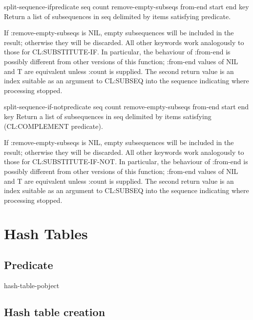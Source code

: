 \documentclass[10pt,english]{book}
\begin{document}
\begin{function}{split-sequence-if}{predicate seq \key count
    remove-empty-subseqs from-end start end key}
  Return a list of subsequences in seq delimited by items satisfying
  predicate.

  If :remove-empty-subseqs is NIL, empty subsequences will be included
  in the result; otherwise they will be discarded.  All other keywords
  work analogously to those for CL:SUBSTITUTE-IF.  In particular, the
  behaviour of :from-end is possibly different from other versions of
  this function; :from-end values of NIL and T are equivalent unless
  :count is supplied. The second return value is an index suitable as an
  argument to CL:SUBSEQ into the sequence indicating where processing
  stopped.  
\end{function}

\begin{function}{split-sequence-if-not}{predicate seq \key count
    remove-empty-subseqs from-end start end key}
  Return a list of subsequences in seq delimited by items satisfying
  (CL:COMPLEMENT predicate).

  If :remove-empty-subseqs is NIL, empty subsequences will be included
  in the result; otherwise they will be discarded. All other keywords
  work analogously to those for CL:SUBSTITUTE-IF-NOT. In particular,
  the behaviour of :from-end is possibly different from other versions
  of this function; :from-end values of NIL and T are equivalent
  unless :count is supplied. The second return value is an index
  suitable as an argument to CL:SUBSEQ into the sequence indicating
  where processing stopped.
\end{function}


\chapter{Hash Tables}

\section{Predicate}
\label{sec:hashtable-predicate}

\begin{function}{hash-table-p}{object}
  
\end{function}

\section{Hash table creation}
\label{sec:hash-table-creation}
\end{document}
